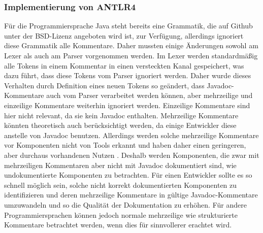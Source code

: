 \subsubsection{Implementierung von ANTLR4}
Für die Programmiersprache Java steht bereits eine Grammatik, die auf Github unter der BSD-Lizenz angeboten wird ist, zur Verfügung\cite{antlr_grammar_github}, allerdings ignoriert diese Grammatik alle Kommentare. Daher mussten einige Änderungen sowohl am Lexer als auch am Parser vorgenommen werden. Im Lexer werden standardmäßig alle Tokens in einem Kommentar in einen versteckten Kanal gespeichert, was dazu führt, dass diese Tokens vom Parser ignoriert werden. Daher wurde dieses Verhalten durch Definition eines neuen Tokens so geändert, dass Javadoc-Kommentare auch vom Parser verarbeitet werden können, aber mehrzeilige und einzeilige Kommentare weiterhin ignoriert werden. Einzeilige Kommentare sind hier nicht relevant, da sie kein Javadoc enthalten. Mehrzeilige Kommentare könnten theoretisch auch berücksichtigt werden, da einige Entwickler diese anstelle von Javadoc benutzen. Allerdings werden solche mehrzeilige Kommentare vor Komponenten nicht von Tools erkannt und haben daher einen geringeren, aber durchaus vorhandenen Nutzen \cite[S. 4]{HowDocumentationEvolvesoverTime}. Deshalb werden Komponenten, die zwar mit mehrzeiligen Kommentaren aber nicht mit Javadoc dokumentiert sind, wie undokumentierte Komponenten zu betrachten. Für einen Entwickler sollte es so schnell möglich sein, solche nicht korrekt dokumentierten Komponenten zu identifizieren und deren mehrzeilige Kommentare in gültige Javadoc-Kommentare umzuwandeln und so die Qualität der Dokumentation zu erhöhen. Für andere Programmiersprachen können jedoch normale mehrzeilige wie strukturierte Kommentare betrachtet werden, wenn dies für sinnvollerer erachtet wird.

